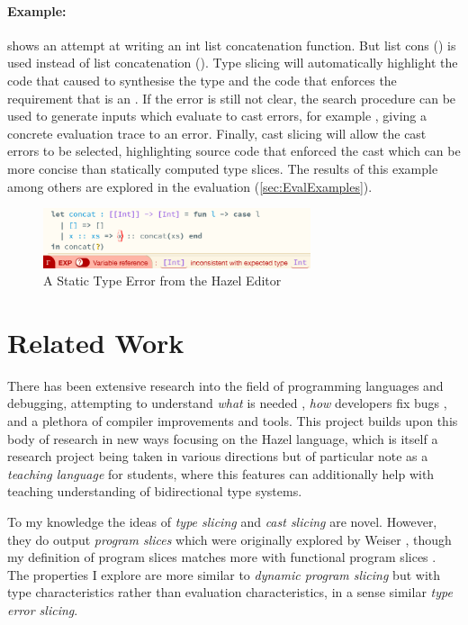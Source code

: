 \paragraph{Example:}  shows an attempt at writing an int list concatenation function. But list cons (\code{::}) is used instead of list concatenation (). Type slicing will automatically highlight the code that caused  to synthesise the \code{[Int]} type and the code that enforces the requirement that  is an . If the error is still not clear, the search procedure can be used to generate inputs which evaluate to cast errors, for example , giving a concrete evaluation trace to an error. Finally, cast slicing will allow the cast errors to be selected, highlighting source code that enforced the cast which can be more concise than statically computed type slices. The results of this example among others are explored in the evaluation (\cref{sec:EvalExamples}).

\begin{figure}[h]
\centering
\includegraphics[width=0.7\textwidth]{Media/Figures/concat_error}
\caption{A Static Type Error from the Hazel Editor}
\label{fig:ErrorExample}
\end{figure}

\section{Related Work}
\label{sec:RelatedWork}
There has been extensive research into the field of programming languages and debugging, attempting to understand \textit{what} is needed \cite{DebugNeeds}, \textit{how} developers fix bugs \cite{HowFixBugs}, and a plethora of compiler improvements and tools. This project builds upon this body of research in new ways focusing on the Hazel language, which is itself a research project being taken in various directions but of particular note as a \textit{teaching language} \cite{HazelTutor} for students, where this features can additionally help with teaching understanding of bidirectional type systems. 

To my knowledge the ideas of \textit{type slicing} and \textit{cast slicing} are novel. However, they do output \textit{program slices} which were originally explored by Weiser \cite{ProgSlice}, though my definition of program slices matches more with functional program slices \cite{FunctionalProgExplain}.  The properties I explore are more similar to \textit{dynamic program slicing} \cite{DynProgSlice} but with type characteristics rather than evaluation characteristics, in a sense similar \textit{type error slicing}\cite{ErrSlice, HaackErrSlice}.

